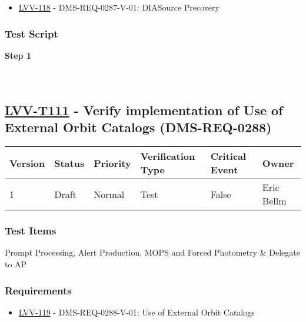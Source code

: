\begin{itemize}
\tightlist
\item
  \href{https://jira.lsstcorp.org/browse/LVV-118}{LVV-118} -
  DMS-REQ-0287-V-01: DIASource Precovery
\end{itemize}

\hypertarget{test-script-87}{%
\subsubsection{Test Script}\label{test-script-87}}

\textbf{Step 1}\\
~\\
~\\

\hypertarget{lvv-t111---verify-implementation-of-use-of-external-orbit-catalogs-dms-req-0288}{%
\subsection{\texorpdfstring{\href{https://jira.lsstcorp.org/secure/Tests.jspa\#/testCase/LVV-T111}{LVV-T111}
- Verify implementation of Use of External Orbit Catalogs
(DMS-REQ-0288)}{LVV-T111 - Verify implementation of Use of External Orbit Catalogs (DMS-REQ-0288)}}\label{lvv-t111---verify-implementation-of-use-of-external-orbit-catalogs-dms-req-0288}}

\begin{longtable}[]{@{}llllll@{}}
\toprule
Version & Status & Priority & Verification Type & Critical Event &
Owner\tabularnewline
\midrule
\endhead
1 & Draft & Normal & Test & False & Eric Bellm\tabularnewline
\bottomrule
\end{longtable}

\hypertarget{test-items-87}{%
\subsubsection{Test Items}\label{test-items-87}}

Prompt Processing, Alert Production, MOPS and Forced Photometry \&
Delegate to AP

\hypertarget{requirements-88}{%
\subsubsection{Requirements}\label{requirements-88}}

\begin{itemize}
\tightlist
\item
  \href{https://jira.lsstcorp.org/browse/LVV-119}{LVV-119} -
  DMS-REQ-0288-V-01: Use of External Orbit Catalogs
\end{itemize}

